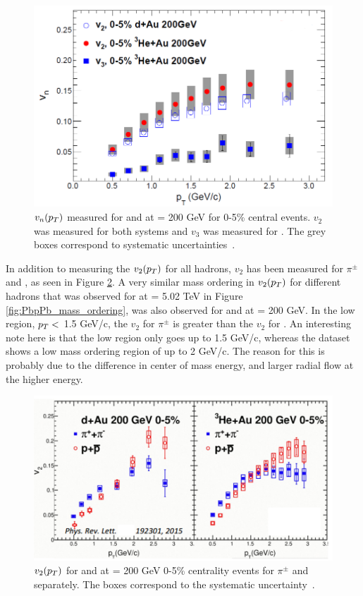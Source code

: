 \begin{figure}[h!]
\begin{center}
\includegraphics[width=0.75\linewidth]{figs/hedau_v2_v3.PNG}
\caption{ $v_n(\mbox{$p_T$})$ measured for \dau and \hau at \sqsn = 200 GeV for 0-5\% central events. $v_2$ was measured for both systems and $v_3$ was measured for \hau. The grey boxes correspond to systematic uncertainties~\cite{PhysRevLett.115.142301}.}
\label{fig:dhau_v2_v3}
\end{center}
\end{figure}

In addition to measuring the $v_2(\mbox{$p_T$})$ for all hadrons, $v_2$ has been measured for $\pi^{\pm}$ and \ppbar, as seen in Figure \ref{fig:dhau_mass_ordering}. A very similar mass ordering in $v_2(\mbox{$p_T$})$ for different hadrons that was observed for \ppb at \sqsn = 5.02 TeV  in Figure \ref{fig:PbpPb_mass_ordering}, was also observed for \dau and \hau at \sqsn =  200 GeV. In the low \pt region, $ \mbox{$p_T$} <$ 1.5 GeV/c, the $v_2$ for $\pi^{\pm}$ is greater than the $v_2$ for \ppbar. An interesting note here is that the low \pt region only goes up to 1.5 GeV/c, whereas the \ppb dataset shows a low \pt mass ordering region of up to 2 GeV/c. The reason for this is probably due to the difference in center of mass energy, and larger radial flow at the higher energy.

\begin{figure}[h!]
\begin{center}
\includegraphics[width=0.75\linewidth]{figs/dhau_mass_ordering_phenix.PNG}
\caption{ $v_2(\mbox{$p_T$})$ for \dau and \hau at \sqsn = 200 GeV 0-5\% centrality events for $\pi^{\pm}$ and \ppbar separately. The boxes correspond to the systematic uncertainty~\cite{PhysRevLett.115.142301}.}
\label{fig:dhau_mass_ordering}
\end{center}
\end{figure}

